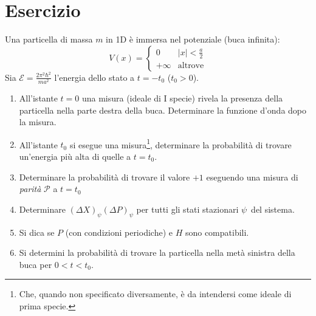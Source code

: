 \documentclass[../../FisicaTeorica.tex]{subfiles}
\begin{document}
\section{Esercizio \theEsercizio}
Una particella di massa $m$ in 1D è immersa nel potenziale (buca infinita):
\[
V(x)=\begin{cases}
0 & |x|<\frac{a}{2}\\
+\infty & \text{altrove}
\end{cases}
\]
Sia $\mathcal{E}=\frac{2\pi^2\hbar^2}{ma^2}$ l'energia dello stato a $t=-t_0$ ($t_0>0$).
\begin{enumerate}
\item All'istante $t=0$ una misura (ideale di I specie) rivela la presenza della particella nella parte destra della buca. Determinare la funzione d'onda dopo la misura.
\item All'istante $t_0$ si esegue una misura\footnote{Che, quando non specificato diversamente, è da intendersi come ideale di prima specie.}, determinare la probabilità di trovare un'energia più alta di quelle a $t=t_0$.
\item Determinare la probabilità di trovare il valore $+1$ eseguendo una misura di \textit{parità} $\mathcal{P}$ a $t=t_0$
\item Determinare $(\Delta X)_{\psi}(\Delta P)_\psi$ per tutti gli stati stazionari $\psi$\ del sistema.
\item Si dica se $P$ (con condizioni periodiche) e $H$ sono compatibili.
\item Si determini la probabilità di trovare la particella nella metà sinistra della buca per $0<t<t_0$.
\end{enumerate}
\end{document}
